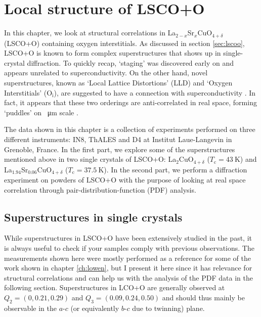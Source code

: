 \chapter{Local structure of LSCO+O}\label{ch:local}
In this chapter, we look at structural correlations in La$_{2-x}$Sr$_x$CuO$_{4+\delta}$ (LSCO+O) containing oxygen interstitials. As discussed in section \ref{sec:lscoo}, LSCO+O is known to form complex superstructures that shows up in single-crystal diffraction. To quickly recap, `staging' \cite{Wells1997,Ray2017} was discovered early on and appears unrelated to superconductivity. On the other hand, novel superstructures, known as `Local Lattice Distortions' (LLD) and `Oxygen Interstitials' (O$_\text{i}$), are suggested to have a connection with superconductivity \cite{Poccia2011}. In fact, it appears that these two orderings are anti-correlated in real space, forming `puddles' on \SI{}{\micro\meter} scale \cite{Poccia2012}.

The data shown in this chapter is a collection of experiments performed on three different instruments: IN8, ThALES and D4 at Institut Laue-Langevin in Grenoble, France. In the first part, we explore some of the superstructures mentioned above in two single crystals of LSCO+O: La$_2$CuO$_{4+\delta}$ ($T_\text{c} = \SI{43}{\kelvin}$) and La$_{1.94}$Sr$_{0.06}$CuO$_{4+\delta}$ ($T_\text{c} = \SI{37.5}{\kelvin}$). In the second part, we perform a diffraction experiment on powders of LSCO+O with the purpose of looking at real space correlation through pair-distribution-function (PDF) analysis.

\section{Superstructures in single crystals}\label{sec:single_crystal_superstructures}
While superstructures in LSCO+O have been extensively studied in the past, it is always useful to check if your samples comply with previous observations. The measurements shown here were mostly performed as a reference for some of the work shown in chapter \ref{ch:lowen}, but I present it here since it has relevance for structural correlations and can help us with the analysis of the PDF data in the following section. Superstructures in LCO+O are generally observed at $Q_2 = (0, 0.21, 0.29)$ and $Q_3 = (0.09, 0.24, 0.50)$ \cite{Kusmartsev2000} and should thus mainly be observable in the $a$-$c$ (or equivalently $b$-$c$ due to twinning) plane.

